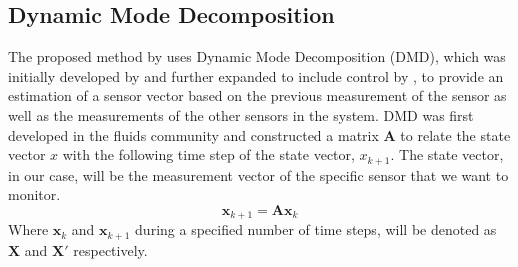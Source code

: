 \begin{figure}[h!tb]
	\centering
\end{figure}
%
%
%

\subsection{Dynamic Mode Decomposition}
The proposed method by \cite{DeSilva2020} uses Dynamic Mode Decomposition (DMD), which was initially developed by \cite{schmid2011applications} and further expanded to include control by \cite{proctor2016dynamic}, to provide an estimation of a sensor vector based on the previous measurement of the sensor as well as the measurements of the other sensors in the system. DMD was first developed in the fluids community and constructed a matrix $\mathbf{A}$ to relate the state vector $x$ with the following time step of the state vector, $x_{k+1}$. The state vector, in our case, will be the measurement vector of the specific sensor that we want to monitor.
\begin{equation}
	\mathbf{x}_{k+1} = \mathbf{Ax}_k
\end{equation}
Where $\mathbf{x}_k$ and $\mathbf{x}_{k+1}$ during a specified number of time steps, will be denoted as $\mathbf{X}$ and $\mathbf{X'}$ respectively.

